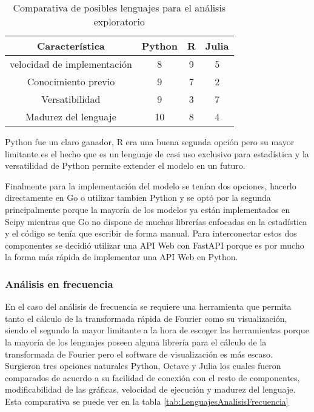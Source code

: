     \begin{table}[ht]
        \caption[Comparativa de posibles lenguajes para el análisis exploratorio]{Comparativa de posibles lenguajes para el análisis exploratorio}
        \label{tab:LenguajesAnalisisExploratorio}
        \begin{center}
            \vspace{0.3cm}
            \begin{tabular}{|c|c|c|c|}
                \hline
                Característica              & Python & R & Julia\\\hline
                \hline
                velocidad de implementación & 8     & 9     & 5 \\\hline
                Conocimiento previo         & 9     & 7     & 2 \\\hline
                Versatibilidad              & 9     & 3     & 7 \\\hline
                Madurez del lenguaje        & 10    & 8     & 4 \\\hline
            \end{tabular}
        \end{center}
    \end{table}

    Python fue un claro ganador, R era una buena segunda opción pero su mayor
    limitante es el hecho que es un lenguaje de casi uso exclusivo para
    estadística y la versatilidad de Python  permite extender el modelo en un
    futuro.

    Finalmente para la implementación del modelo se tenían dos opciones,
    hacerlo directamente en Go o utilizar tambien Python y se optó por la
    segunda principalmente porque la mayoría de los modelos ya están
    implementados en Scipy mientras que Go no dispone de muchas librerías
    enfocadas en la estadística y el código se tenía que escribir de forma
    manual. Para interconectar estos dos componentes se decidió utilizar una
    API Web con FastAPI porque es por mucho la forma más rápida de implementar
    una API Web en Python.

    \subsubsection{Análisis en frecuencia}
    En el caso del análisis de frecuencia se requiere una herramienta que
    permita tanto el cálculo de la transformada rápida de Fourier como su
    visualización, siendo el segundo la mayor limitante a la hora de escoger
    las herramientas porque la mayoría de los lenguajes poseen alguna librería
    para el cálculo de la transformada de Fourier pero el software de
    visualización es más escaso. Surgieron tres opciones naturales Python,
    Octave y Julia los cuales fueron comparados de acuerdo a su facilidad de
    conexión con el resto de componentes, modificabilidad de las gráficas,
    velocidad de ejecución y madurez del lenguaje. Esta comparativa se puede
    ver en la tabla \ref{tab:LenguajesAnalisisFrecuencia}

